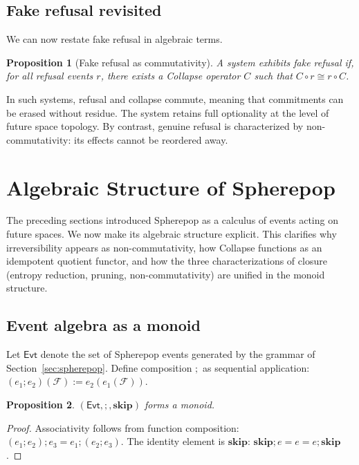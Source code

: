 \documentclass[11pt]{article}
\newtheorem{proposition}{Proposition}
\newcommand{\Future}{\mathcal{F}}
\begin{document}
\subsection{Fake refusal revisited}

We can now restate fake refusal in algebraic terms.

\begin{proposition}[Fake refusal as commutativity]
A system exhibits fake refusal if, for all refusal events $r$, there exists a
Collapse operator $C$ such that $C \circ r \cong r \circ C$.
\end{proposition}

In such systems, refusal and collapse commute, meaning that commitments can be
erased without residue. The system retains full optionality at the level of
future space topology. By contrast, genuine refusal is characterized by
non-commutativity: its effects cannot be reordered away.

\section{Algebraic Structure of Spherepop}
\label{sec:algebra}

The preceding sections introduced Spherepop as a calculus of events acting on
future spaces. We now make its algebraic structure explicit. This clarifies why
irreversibility appears as non-commutativity, how Collapse functions as an
idempotent quotient functor, and how the three characterizations of closure
(entropy reduction, pruning, non-commutativity) are unified in the monoid
structure.

\subsection{Event algebra as a monoid}

Let $\mathsf{Evt}$ denote the set of Spherepop events generated by the grammar
of Section~\ref{sec:spherepop}. Define composition $;$ as sequential
application: $(e_1 ; e_2)(\Future) := e_2(e_1(\Future))$.

\begin{proposition}
$(\mathsf{Evt}, ;, \mathbf{skip})$ forms a monoid.
\end{proposition}

\begin{proof}
Associativity follows from function composition:
$(e_1 ; e_2) ; e_3 = e_1 ; (e_2 ; e_3)$.
The identity element is $\mathbf{skip}$:
$\mathbf{skip} ; e = e = e ; \mathbf{skip}$.
\end{proof}
\end{document}
